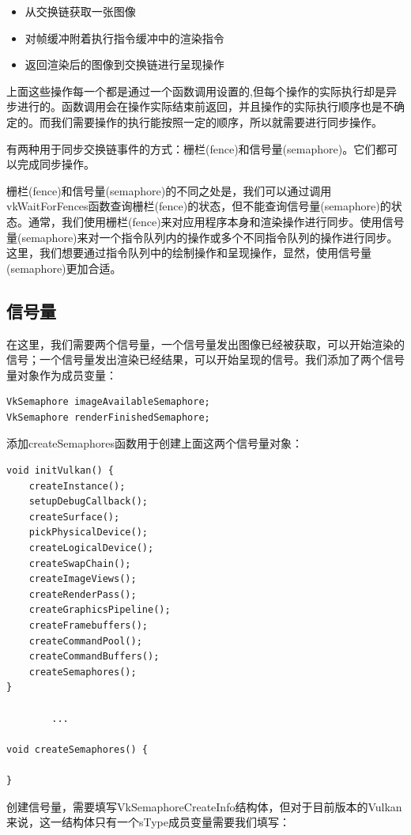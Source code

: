 \documentclass{ctexart}
\begin{document}
\begin{itemize}
	\item 从交换链获取一张图像
	\item 对帧缓冲附着执行指令缓冲中的渲染指令
	\item 返回渲染后的图像到交换链进行呈现操作
\end{itemize}

上面这些操作每一个都是通过一个函数调用设置的,但每个操作的实际执行却是异步进行的。函数调用会在操作实际结束前返回，并且操作的实际执行顺序也是不确定的。而我们需要操作的执行能按照一定的顺序，所以就需要进行同步操作。

有两种用于同步交换链事件的方式：栅栏(fence)和信号量(semaphore)。它们都可以完成同步操作。

栅栏(fence)和信号量(semaphore)的不同之处是，我们可以通过调用vkWaitForFences函数查询栅栏(fence)的状态，但不能查询信号量(semaphore)的状态。通常，我们使用栅栏(fence)来对应用程序本身和渲染操作进行同步。使用信号量(semaphore)来对一个指令队列内的操作或多个不同指令队列的操作进行同步。这里，我们想要通过指令队列中的绘制操作和呈现操作，显然，使用信号量(semaphore)更加合适。

\subsection{信号量}

在这里，我们需要两个信号量，一个信号量发出图像已经被获取，可以开始渲染的信号；一个信号量发出渲染已经结果，可以开始呈现的信号。我们添加了两个信号量对象作为成员变量：

\begin{lstlisting}[language={[ANSI]C}]
VkSemaphore imageAvailableSemaphore;
VkSemaphore renderFinishedSemaphore;
\end{lstlisting}

添加createSemaphores函数用于创建上面这两个信号量对象：

\begin{lstlisting}[language={[ANSI]C}]
void initVulkan() {
	createInstance();
	setupDebugCallback();
	createSurface();
	pickPhysicalDevice();
	createLogicalDevice();
	createSwapChain();
	createImageViews();
	createRenderPass();
	createGraphicsPipeline();
	createFramebuffers();
	createCommandPool();
	createCommandBuffers();
	createSemaphores();
}

		...

void createSemaphores() {

}
\end{lstlisting}

创建信号量，需要填写VkSemaphoreCreateInfo结构体，但对于目前版本的Vulkan来说，这一结构体只有一个sType成员变量需要我们填写：
\end{document}

